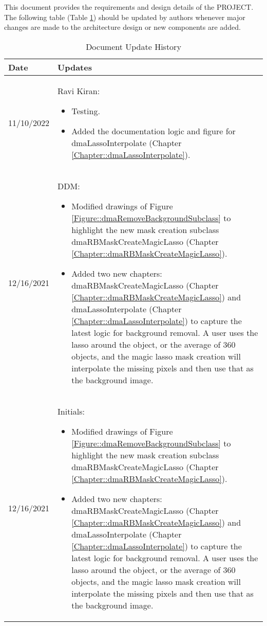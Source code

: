 This document provides the requirements and design details of the
PROJECT.  The following table (Table \ref{Table::UpdateHistory}) should be
updated by authors whenever major changes are made to the architecture
design or new components are added.  

\begin{longtable}{|l||p{13.5cm}|}
\caption{Document Update History \label{Table::UpdateHistory}}\\
\hline
\textbf{Date} & \textbf{Updates} \\
\hline 
\endhead

11/10/2022 & Ravi Kiran:
\begin{itemize}[topsep=0pt,itemsep=0pt,parsep=0pt,partopsep=0pt,leftmargin=12pt]
\item Testing.
\item Added the documentation logic and figure for dmaLassoInterpolate 
(Chapter \ref{Chapter::dmaLassoInterpolate}). 
\end{itemize} 
\\ \hline

12/16/2021 & DDM:
\begin{itemize}[topsep=0pt,itemsep=0pt,parsep=0pt,partopsep=0pt,leftmargin=12pt]
\item Modified drawings of Figure \ref{Figure::dmaRemoveBackgroundSubclass} to
highlight the new mask creation subclass dmaRBMaskCreateMagicLasso (Chapter 
\ref{Chapter::dmaRBMaskCreateMagicLasso}).
\item Added two new chapters: dmaRBMaskCreateMagicLasso
(Chapter \ref{Chapter::dmaRBMaskCreateMagicLasso}) and dmaLassoInterpolate
(Chapter \ref{Chapter::dmaLassoInterpolate}) to capture the latest logic for 
background removal.  A user uses the lasso around the object, or the average 
of 360 objects, and the magic lasso mask creation will interpolate the missing
pixels and then use that as the background image. 
\end{itemize} 
\\ \hline

12/16/2021 & Initials:
\begin{itemize}[topsep=0pt,itemsep=0pt,parsep=0pt,partopsep=0pt,leftmargin=12pt]
\item Modified drawings of Figure \ref{Figure::dmaRemoveBackgroundSubclass} to
highlight the new mask creation subclass dmaRBMaskCreateMagicLasso (Chapter 
\ref{Chapter::dmaRBMaskCreateMagicLasso}).
\item Added two new chapters: dmaRBMaskCreateMagicLasso
(Chapter \ref{Chapter::dmaRBMaskCreateMagicLasso}) and dmaLassoInterpolate
(Chapter \ref{Chapter::dmaLassoInterpolate}) to capture the latest logic for 
background removal.  A user uses the lasso around the object, or the average 
of 360 objects, and the magic lasso mask creation will interpolate the missing
pixels and then use that as the background image. 
\end{itemize} 
\\ \hline


\end{longtable}
